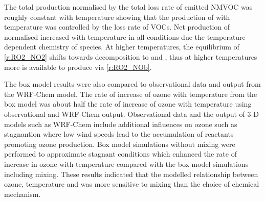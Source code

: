The total  production normalised by the total loss rate of emitted NMVOC was roughly constant with temperature showing that the production of  with temperature was controlled by the loss rate of VOCs.
Net production of normalised  increased with temperature in all  conditions due the temperature-dependent chemistry of  species.
At higher temperatures, the equilibrium of  \eqref{r:RO2_NO2} shifts towards decomposition to  and , thus at higher temperatures more  is available to produce  via \eqref{r:RO2_NOb}.

The box model results were also compared to observational data and output from the WRF-Chem model.
The rate of increase of ozone with temperature from the box model was about half the rate of increase of ozone with temperature using observational and WRF-Chem output.
Observational data and the output of 3-D models such as WRF-Chem include additional influences on ozone such as stagnantion where low wind speeds lead to the accumulation of reactants promoting ozone production.
Box model simulations without mixing were performed to approximate stagnant conditions which enhanced the rate of increase in ozone with temperature compared with the box model simulations including mixing.
These results indicated that the modelled relationship between ozone, temperature and  was more sensitive to mixing than the choice of chemical mechanism.
